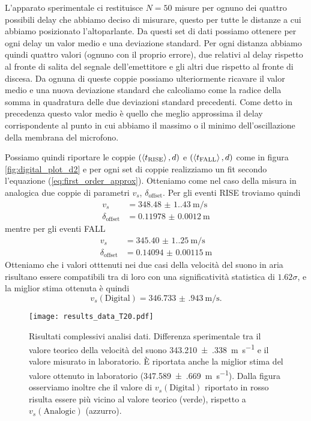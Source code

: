 \documentclass[
    rmp,
    reprint, 
    superscriptaddress, 
    altaffilletter, 
    amsmath, 
    amssymb, 
    a4paper,
    varvw]{revtex4-2}
\begin{document}
L'apparato sperimentale ci restituisce $N=50$ misure per ognuno dei quattro possibili delay che abbiamo deciso di misurare, questo per tutte le distanze a cui abbiamo posizionato l'altoparlante. Da questi set di dati possiamo ottenere per ogni delay un valor medio e una deviazione standard. Per ogni distanza abbiamo quindi quattro valori (ognuno con il proprio errore), due relativi al delay rispetto al fronte di salita del segnale dell'emettitore e gli altri due rispetto al fronte di discesa. Da ognuna di queste coppie possiamo ulteriormente ricavare il valor medio e una nuova deviazione standard che calcoliamo come la radice della somma in quadratura delle due deviazioni standard precedenti. Come detto in precedenza questo valor medio è quello che meglio approssima il delay corrispondente al punto in cui abbiamo il massimo o il minimo dell'oscillazione della membrana del microfono. 

Possiamo quindi riportare le coppie $(\expval{t_\text{RISE}}, d)$ e $(\expval{t_\text{FALL}}, d)$ come in figura \ref{fig:digital_plot_d2} e per ogni set di coppie realizziamo un fit secondo l'equazione (\ref{eq:first_order_approx}). Otteniamo come nel caso della misura in analogica due coppie di parametri $v_s$, $\delta_\text{offset}$.
Per gli eventi RISE troviamo quindi
\begin{align*}
    v_s &= \SI{348.48(1.43)}{\metre\per\second} \\
    \delta_\text{offset} &= \SI{0.11978(120)}{\metre}
\end{align*}
mentre per gli eventi FALL
\begin{align*}
    v_s &= \SI{345.40(1.25)}{\metre\per\second} \\
    \delta_\text{offset} &= \SI{0.14094(115)}{\metre}
\end{align*}
Otteniamo che i valori otttenuti nei due casi della velocità del suono in aria risultano essere compatibili tra di loro con una significatività statistica di $1.62\sigma$, e la miglior stima ottenuta è quindi \[v_s(\text{Digital}) = \SI{346.733(943)}{\metre\per\second}.\]


\begin{figure}
    \centering
    \texttt{[image: results\_data\_T20.pdf]}
    \caption{Risultati complessivi analisi dati. Differenza sperimentale tra il valore teorico della velocità del suono \SI{343.210(338)}{\metre\per\second} e il valore misurato in laboratorio. \`E riportata anche la miglior stima del valore ottenuto in laboratorio (\SI{347.589(669)}{\metre\per\second}). Dalla figura osserviamo inoltre che il valore di $v_s(\text{Digital})$ riportato in rosso risulta essere più vicino al valore teorico (verde), rispetto a $v_s(\text{Analogic})$ (azzurro).}\label{fig:results}
\end{figure}
\end{document}
